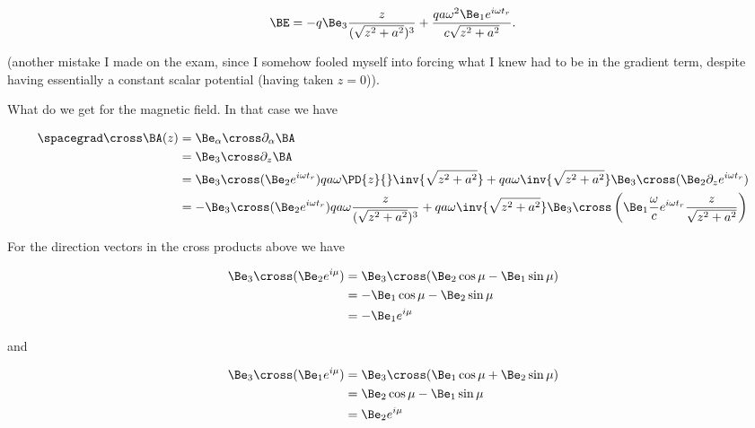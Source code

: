 \begin{equation}\label{eqn:relativisticElectrodynamicsExamReflection:n}
\BE = 
-q \Be_3 \frac{z}{(\sqrt{z^2 + a^2})^3}
+
\frac{q a \omega^2 \Be_1 e^{i \omega t_r} }{c \sqrt{z^2 + a^2}}.
\end{equation}

(another mistake I made on the exam, since I somehow fooled myself into forcing what I knew had to be in the gradient term, despite having essentially a constant scalar potential (having taken $z = 0$)).

What do we get for the magnetic field.  In that case we have

\begin{align*}
\spacegrad \cross \BA(z)
&=
\Be_\alpha \cross \partial_\alpha \BA \\
&=
\Be_3 \cross \partial_z \BA \\
&=
\Be_3 \cross (\Be_2 e^{i \omega t_r} ) q a \omega \PD{z}{} \inv{\sqrt{z^2 + a^2}} 
+
q a \omega \inv{\sqrt{z^2 + a^2}} \Be_3 \cross (\Be_2 \partial_z e^{i \omega t_r} ) \\
&=
-\Be_3 \cross (\Be_2 e^{i \omega t_r} ) q a \omega \frac{z}{(\sqrt{z^2 + a^2})^3} 
+
q a \omega \inv{\sqrt{z^2 + a^2}} \Be_3 \cross \left( \Be_1 \frac{\omega}{c} e^{i \omega t_r} \frac{z}{\sqrt{z^2 + a^2} } \right)
\end{align*}


For the direction vectors in the cross products above we have

\begin{align*}
\Be_3 \cross (\Be_2 e^{i \mu})
&=
\Be_3 \cross (\Be_2 \cos\mu - \Be_1 \sin\mu) \\
&=
-\Be_1 \cos\mu - \Be_2 \sin\mu \\
&=
-\Be_1 e^{i \mu}
\end{align*}

and

\begin{align*}
\Be_3 \cross (\Be_1 e^{i \mu})
&=
\Be_3 \cross (\Be_1 \cos\mu + \Be_2 \sin\mu) \\
&=
\Be_2 \cos\mu - \Be_1 \sin\mu \\
&=
\Be_2 e^{i \mu}
\end{align*}

